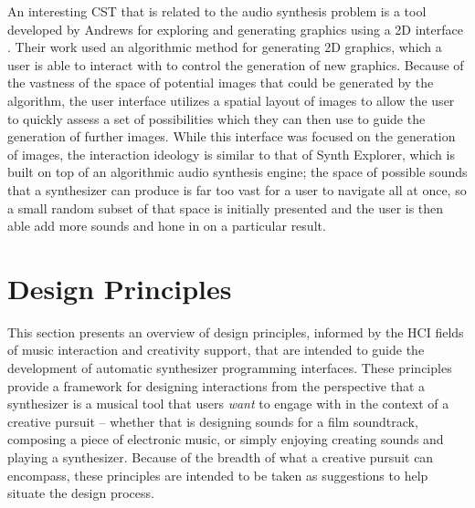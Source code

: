 An interesting CST that is related to the audio synthesis problem is a tool developed by Andrews for exploring and generating graphics using a 2D interface \cite{10.1145/3325480.3325506}. Their work used an algorithmic method for generating 2D graphics, which a user is able to interact with to control the generation of new graphics. Because of the vastness of the space of potential images that could be generated by the algorithm, the user interface utilizes a spatial layout of images to allow the user to quickly assess a set of possibilities which they can then use to guide the generation of further images. While this interface was focused on the generation of images, the interaction ideology is similar to that of Synth Explorer, which is built on top of an algorithmic audio synthesis engine; the space of possible sounds that a synthesizer can produce is far too vast for a user to navigate all at once, so a small random subset of that space is initially presented and the user is then able add more sounds and hone in on a particular result.

\section{Design Principles}
This section presents an overview of design principles, informed by the HCI fields of music interaction and creativity support, that are intended to guide the development of automatic synthesizer programming interfaces. These principles provide a framework for designing interactions from the perspective that a synthesizer is a musical tool that users \textit{want} to engage with in the context of a creative pursuit -- whether that is designing sounds for a film soundtrack, composing a piece of electronic music, or simply enjoying creating sounds and playing a synthesizer. Because of the breadth of what a creative pursuit can encompass, these principles are intended to be taken as suggestions to help situate the design process.

